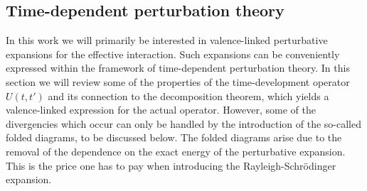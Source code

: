 \subsection{Time-dependent perturbation theory}

In this work we will primarily be interested in valence-linked
perturbative expansions for the effective interaction. Such expansions
can be conveniently expressed within the framework of time-dependent
perturbation theory. In this section we will review some of the
properties of the time-development operator $U(t,t')$ and its
connection to the decomposition theorem, which yields a
valence-linked expression for the actual operator. However, some
of the divergencies which occur can only be handled by the
introduction of the so-called folded diagrams, to be
discussed below. The folded diagrams
arise due to the removal of the dependence on the exact
energy of the perturbative expansion. This is the price one has
to pay when introducing the Rayleigh-Schr\"{o}dinger expansion.

